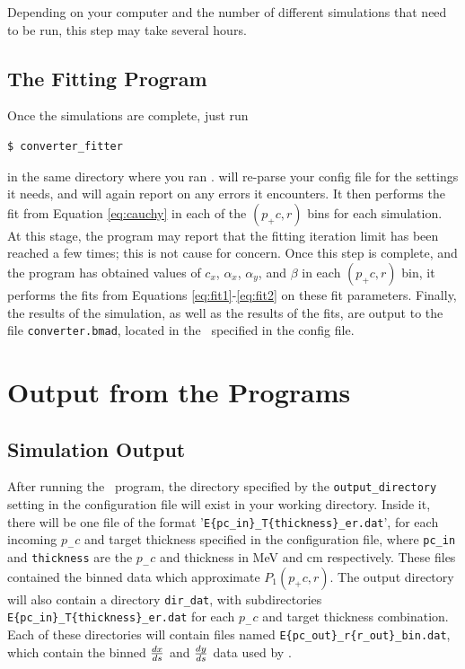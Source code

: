 \documentclass[12pt]{article}
\begin{document}
Depending on your computer and the number of different simulations that need to be run, this step may take several hours.


\subsection{The Fitting Program}

Once the simulations are complete, just run
\begin{verbatim}
$ converter_fitter
\end{verbatim}
in the same directory where you ran \exes.
\exef will re-parse your config file for the settings it needs, and will again report on any errors it encounters.
It then performs the fit from Equation \ref{eq:cauchy} in each of the $(p_+c, r)$ bins for each simulation.
At this stage, the program may report that the fitting iteration limit has been reached a few times; this is not cause for concern.
Once this step is complete, and the program has obtained values of $c_x$, $\alpha_x$, $\alpha_y$, and $\beta$ in each $(p_+c, r)$ bin,
it performs the fits from Equations \ref{eq:fit1}-\ref{eq:fit2} on these fit parameters.
Finally, the results of the simulation, as well as the results of the fits, are output to the file \texttt{converter.bmad}, located in the \outdir \, specified in the config file.

\section{Output from the Programs}

\subsection{Simulation Output}

After running the \exes \, program, the directory specified by the \texttt{output\_directory} setting in the configuration file will exist in your working directory.
Inside it, there will be one file of the format '\texttt{E\{pc\_in\}\_T\{thickness\}\_er.dat}', for each incoming $p_- c$ and target thickness specified in the configuration file, where \texttt{pc\_in} and \texttt{thickness} are the $p_- c$ and thickness in MeV and cm respectively.
These files contained the binned data which approximate $P_1(p_+ c, r)$.
The output directory will also contain a directory \texttt{dir\_dat}, with subdirectories \texttt{E\{pc\_in\}\_T\{thickness\}\_er.dat} for each $p_- c$ and target thickness combination.
Each of these directories will contain files named \texttt{E\{pc\_out\}\_r\{r\_out\}\_bin.dat}, which contain the binned $\frac{dx}{ds}$ and $\frac{dy}{ds}$ data used by \exef.
\end{document}
